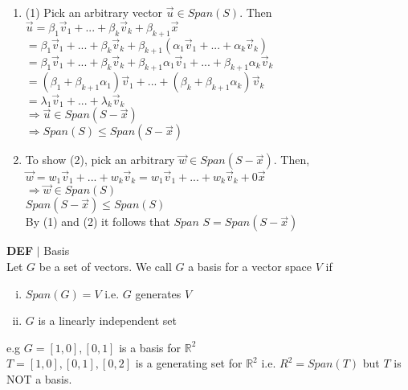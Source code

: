 \documentclass [12pt]{article}
\begin{document}
\begin{enumerate}[\quad]
    \item(1) Pick an arbitrary vector $\overrightarrow{u}\in Span(S)$. Then\\
    $\overrightarrow{u}=\beta_1\overrightarrow{v}_1+...+\beta_k\overrightarrow{v}_k+\beta_{k+1}\overrightarrow{x}$\\
    $=\beta_1\overrightarrow{v}_1+...+\beta_k\overrightarrow{v}_k+\beta_{k+1}(\alpha_1\overrightarrow{v}_1+...+\alpha_k\overrightarrow{v}_k)$\\
    $=\beta_1\overrightarrow{v}_1+...+\beta_k\overrightarrow{v}_k+\beta_{k+1}\alpha_1\overrightarrow{v}_1+...+\beta_{k+1}\alpha_k\overrightarrow{v}_k$\\
    $=(\beta_1+\beta_{k+1}\alpha_1)\overrightarrow{v}_1+...+(\beta_k+\beta_{k+1}\alpha_k)\overrightarrow{v}_k$\\
    $=\lambda_1\overrightarrow{v}_1+...+\lambda_k\overrightarrow{v}_k$\\
    $\Rightarrow\overrightarrow{u}\in Span(S-{\overrightarrow{x}})$\\
    $\Rightarrow Span(S)\leq Span(S-{\overrightarrow{x}})$
    \item To show (2), pick an arbitrary $\overrightarrow{w}\in Span(S-{\overrightarrow{x}})$. Then,\\
    $\overrightarrow{w}=w_1\overrightarrow{v}_1+...+w_k\overrightarrow{v}_k=w_1\overrightarrow{v}_1+...+w_k\overrightarrow{v}_k+0\overrightarrow{x}$\\
    $\Rightarrow\overrightarrow{w}\in Span(S)$\\
    $Span(S-{\overrightarrow{x}})\leq Span(S)$\\
    By (1) and (2) it follows that $Span$ $S=Span(S-{\overrightarrow{x}})$
\end{enumerate}
\begin{framed}
\noindent\textbf{DEF} $|$ Basis\\
Let $G$ be a set of vectors. We call $G$ a basis for a vector space $V$ if
\begin{enumerate}[(i)]
    \item $Span(G)=V$ \indent i.e. $G$ generates $V$
    \item $G$ is a linearly independent set
\end{enumerate}
e.g $G={[1,0],[0,1]}$ is a basis for $\mathbb{R}^2$\\
$T={[1,0],[0,1],[0,2]}$ is a generating set for $\mathbb{R}^2$ i.e. $R^2=Span(T)$ but $T$ is NOT a basis.
\end{framed}
\end{document}
